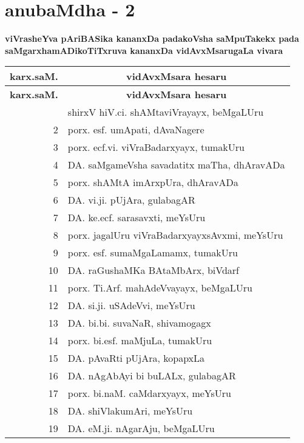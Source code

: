 \chapter*{anubaMdha - 2}

\lhead[]{}
\rhead[]{}

\begin{center}
{\large\bf viVrasheYva pAriBASika kananxDa padakoVsha saMpuTakekx pada saMgarxha\break mADikoTiTxruva kananxDa vidAvxMsarugaLa vivara}
\end{center}

{\renewcommand{\arraystretch}{1.4}
\begin{longtable}{|r|p{10cm}|}
\hline
{\bf karx.saM.} & \multicolumn{1}{c|}{\bf vidAvxMsara hesaru}\\
\hline
\endfirsthead
\hline
{\bf karx.saM.} & \multicolumn{1}{c|}{\bf vidAvxMsara hesaru}\\
\hline
\endhead
\hline
\endfoot
\endlastfoot
1 & shirxV hiV.ci. shAMtaviVrayayx, beMgaLUru\\
\hline
2 & porx. esf. umApati, dAvaNagere\\
\hline
3 & porx. ecf.vi. viVraBadarxyayx, tumakUru\\
\hline
4 & DA. saMgameVsha savadatitx maTha, dhAravADa\\
\hline
5 & porx. shAMtA imArxpUra, dhAravADa\\
\hline
6 & DA. vi.ji. pUjAra, gulabagAR\\
\hline
7 & DA. ke.ecf. sarasavxti, meYsUru\\
\hline
8 & porx. jagalUru viVraBadarxyayxsAvxmi, meYsUru\\
\hline
9 & porx. esf. sumaMgaLamamx, tumakUru\\
\hline
10 & DA. raGushaMKa BAtaMbArx, biVdarf\\
\hline
11 & porx. Ti.Arf. mahAdeVvayayx, beMgaLUru\\
\hline
12 & DA. si.ji. uSAdeVvi, meYsUru\\
\hline
13 & DA. bi.bi. suvaNaR, shivamogagx\\
\hline
14 & porx. bi.esf. maMjuLa, tumakUru\\
\hline
15 & DA. pAvaRti pUjAra, kopapxLa\\
\hline
16 & DA. nAgAbAyi bi buLALx, gulabagAR\\
\hline
17 & porx. bi.naM. caMdarxyayx, meYsUru\\
\hline
18 & DA. shiVlakumAri, meYsUru\\
\hline
19 & DA. eM.ji. nAgarAju, beMgaLUru\\

\end{longtable}}
